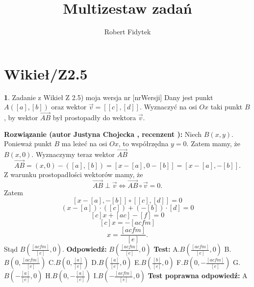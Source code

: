 \documentclass[12pt, a4paper]{article}
\title{Multizestaw zadań}
\author{Robert Fidytek}
\date{}
\theoremstyle{definition} %
\newtheorem{zad}{}
\newcommand{\kategoria}[1]{\section{#1}} %
\newcommand{\zadStart}[1]{\begin{zad}#1\newline} %
\newcommand{\zadStop}{\end{zad}}   %
\newcommand{\rozwStart}[2]{\noindent \textbf{Rozwiązanie (autor #1 , recenzent #2): }\newline} %
\newcommand{\rozwStop}{\newline}                                            %
\newcommand{\odpStart}{\noindent \textbf{Odpowiedź:}\newline}    %
\newcommand{\odpStop}{\newline}                                             %
\newcommand{\testStart}{\noindent \textbf{Test:}\newline} %
\newcommand{\testStop}{\newline} %
\newcommand{\kluczStart}{\noindent \textbf{Test poprawna odpowiedź:}\newline} %
\newcommand{\kluczStop}{\newline} %
\begin{document}
\maketitle


\kategoria{Wikieł/Z2.5}
\zadStart{Zadanie z Wikieł Z 2.5) moja wersja nr [nrWersji]}
Dany jest punkt $A([a],[b])$ oraz wektor $\overrightarrow{v}=[[c],[d]]$. Wyznaczyć na osi $Ox$ taki punkt $B$, by wektor $\overrightarrow{AB}$ był prostopadły do wektora $\overrightarrow{v}$.
\zadStop
\rozwStart{Justyna Chojecka}{}
Niech $B(x,y)$. Ponieważ punkt $B$ ma leżeć na osi $Ox$, to współrzędna $y=0$. Zatem mamy, że $B(x,0)$. Wyznaczymy teraz wektor $\overrightarrow{AB}$
$$\overrightarrow{AB}=(x,0)-([a],[b])=[x-[a],0-[b]]=[x-[a],-[b]].$$
Z warunku prostopadłości wektorów mamy, że
$$\overrightarrow{AB}\perp\overrightarrow{v}\iff\overrightarrow{AB}\circ\overrightarrow{v}=0.$$
Zatem
$$[x-[a],-[b]]\circ [[c],[d]]=0$$
$$(x-[a])\cdot([c])+(-[b])\cdot [d]=0$$
$$[c]x+[ac]-[f]=0$$
$$[c]x=-[acfm]$$
$$x=\frac{[acfm]}{[e]}.$$
Stąd $B\left(\frac{[acfm]}{[e]},0\right)$.
\rozwStop
\odpStart
$B\left(\frac{[acfm]}{[e]},0\right)$
\odpStop
\testStart
A.$B\left(\frac{[acfm]}{[e]},0\right)$
B.$B\left(0,\frac{[acfm]}{[e]}\right)$
C.$B\left(0,\frac{[a]}{[e]}\right)$
D.$B\left(\frac{[a]}{[e]},0\right)$
E.$B\left(\frac{[b]}{[e]},0\right)$
F.$B\left(0,-\frac{[acfm]}{[e]}\right)$
G.$B\left(-\frac{[a]}{[e]},0\right)$
H.$B\left(0,-\frac{[a]}{[e]}\right)$
I.$B\left(-\frac{[acfm]}{[e]},0\right)$
\testStop
\kluczStart
A
\kluczStop
\end{document}
